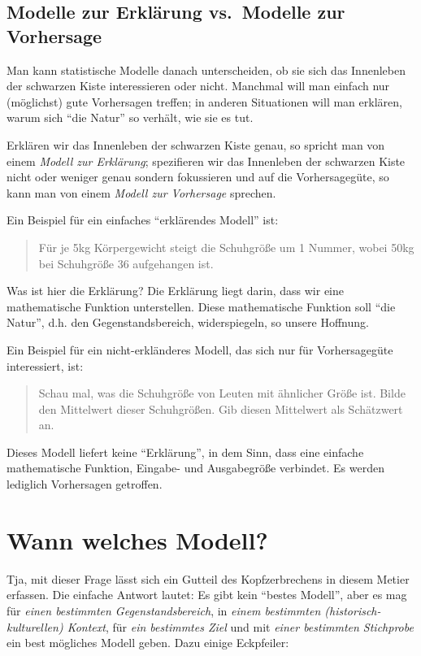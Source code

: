 \documentclass[12pt,]{book}
\begin{document}
\subsection{Modelle zur Erklärung vs.~Modelle zur
Vorhersage}\label{modelle-zur-erklarung-vs.modelle-zur-vorhersage}

Man kann statistische Modelle danach unterscheiden, ob sie sich das
Innenleben der schwarzen Kiste interessieren oder nicht. Manchmal will
man einfach nur (möglichst) gute Vorhersagen treffen; in anderen
Situationen will man erklären, warum sich ``die Natur'' so verhält, wie
sie es tut.

Erklären wir das Innenleben der schwarzen Kiste genau, so spricht man
von einem \emph{Modell zur Erklärung}; spezifieren wir das Innenleben
der schwarzen Kiste nicht oder weniger genau sondern fokussieren und auf
die Vorhersagegüte, so kann man von einem \emph{Modell zur Vorhersage}
sprechen.

Ein Beispiel für ein einfaches ``erklärendes Modell'' ist:

\begin{quote}
Für je 5kg Körpergewicht steigt die Schuhgröße um 1 Nummer, wobei 50kg
bei Schuhgröße 36 aufgehangen ist.
\end{quote}

Was ist hier die Erklärung? Die Erklärung liegt darin, dass wir eine
mathematische Funktion unterstellen. Diese mathematische Funktion soll
``die Natur'', d.h. den Gegenstandsbereich, widerspiegeln, so unsere
Hoffnung.

Ein Beispiel für ein nicht-erkländeres Modell, das sich nur für
Vorhersagegüte interessiert, ist:

\begin{quote}
Schau mal, was die Schuhgröße von Leuten mit ähnlicher Größe ist. Bilde
den Mittelwert dieser Schuhgrößen. Gib diesen Mittelwert als Schätzwert
an.
\end{quote}

Dieses Modell liefert keine ``Erklärung'', in dem Sinn, dass eine
einfache mathematische Funktion, Eingabe- und Ausgabegröße verbindet. Es
werden lediglich Vorhersagen getroffen.

\section{Wann welches Modell?}\label{wann-welches-modell}

Tja, mit dieser Frage lässt sich ein Gutteil des Kopfzerbrechens in
diesem Metier erfassen. Die einfache Antwort lautet: Es gibt kein
``bestes Modell'', aber es mag für \emph{einen bestimmten
Gegenstandsbereich}, in \emph{einem bestimmten (historisch-kulturellen)
Kontext}, für \emph{ein bestimmtes Ziel} und mit \emph{einer bestimmten
Stichprobe} ein best mögliches Modell geben. Dazu einige Eckpfeiler:
\end{document}
